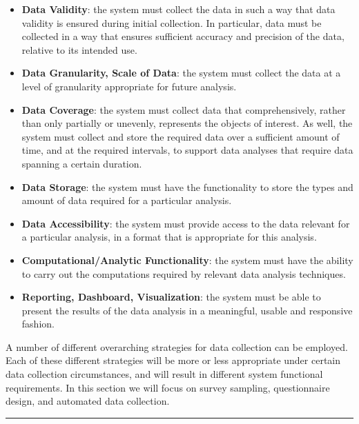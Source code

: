\begin{itemize}[noitemsep]
\item \textbf{Data Validity}: the system must collect the data in such a way that data validity is ensured during initial collection. In particular, data must be collected in a way that ensures sufficient accuracy and precision of the data, relative to its intended use.
\item \textbf{Data Granularity, Scale of Data}: the system must collect the data at a level of granularity appropriate for future analysis.
\item \textbf{Data Coverage}: the system must collect data that comprehensively, rather than only partially or unevenly, represents the objects of interest. As well, the system must collect and store the required data over a sufficient amount of time, and at the required intervals, to support data analyses that require data spanning a certain duration.
\item \textbf{Data Storage}: the system must have the functionality to store the types and amount of data required for a particular analysis.
\item \textbf{Data Accessibility}: the system must provide access to the data relevant for a particular analysis, in a format that is appropriate for this analysis.
\item \textbf{Computational/Analytic Functionality}: the system must have the ability to carry out the computations required by relevant data analysis techniques.
\item \textbf{Reporting, Dashboard, Visualization}: the system must be able to present the results of the data analysis in a meaningful, usable and responsive fashion.
\end{itemize}
\newpage\noindent A number of different overarching strategies for data collection can be employed. Each of these different strategies will be more or less appropriate under certain data collection circumstances, and will result in different system functional requirements. In this section we will focus on survey sampling, questionnaire design, and automated data collection. 
\begin{center}
    \rule{0.5\textwidth}{.4pt}
\end{center}
